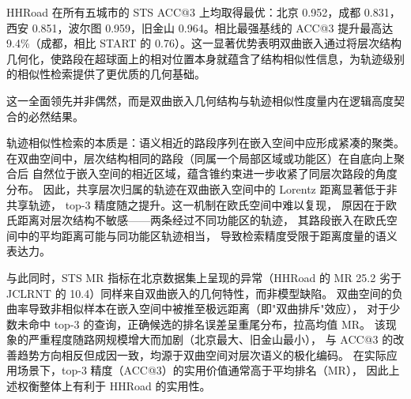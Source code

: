 HHRoad 在所有五城市的 STS ACC@3 上均取得最优：北京 0.952，成都 0.831，西安 0.851，波尔图 0.959，旧金山 0.964。相比最强基线的 ACC@3 提升最高达 9.4\%（成都，相比 START 的 0.76）。这一显著优势表明双曲嵌入通过将层次结构几何化，使路段在超球面上的相对位置本身就蕴含了结构相似性信息，为轨迹级别的相似性检索提供了更优质的几何基础。

这一全面领先并非偶然，而是双曲嵌入几何结构与轨迹相似性度量内在逻辑高度契合的必然结果。

轨迹相似性检索的本质是：语义相近的路段序列在嵌入空间中应形成紧凑的聚类。
在双曲空间中，层次结构相同的路段（同属一个局部区域或功能区）在自底向上聚合后
自然位于嵌入空间的相近区域，蕴含锥约束进一步收紧了同层次路段的角度分布。
因此，共享层次归属的轨迹在双曲嵌入空间中的 Lorentz 距离显著低于非共享轨迹，
top-3 精度随之提升。这一机制在欧氏空间中难以复现，
原因在于欧氏距离对层次结构不敏感——两条经过不同功能区的轨迹，
其路段嵌入在欧氏空间中的平均距离可能与同功能区轨迹相当，
导致检索精度受限于距离度量的语义表达力。

与此同时，STS MR 指标在北京数据集上呈现的异常（HHRoad 的 MR 25.2 劣于 JCLRNT 的 10.4）同样来自双曲嵌入的几何特性，而非模型缺陷。
双曲空间的负曲率导致非相似样本在嵌入空间中被推至极远距离（即"双曲排斥"效应），
对于少数未命中 top-3 的查询，正确候选的排名误差呈重尾分布，拉高均值 MR。
该现象的严重程度随路网规模增大而加剧（北京最大、旧金山最小），
与 ACC@3 的改善趋势方向相反但成因一致，均源于双曲空间对层次语义的极化编码。
在实际应用场景下，top-3 精度（ACC@3）的实用价值通常高于平均排名（MR），
因此上述权衡整体上有利于 HHRoad 的实用性。

